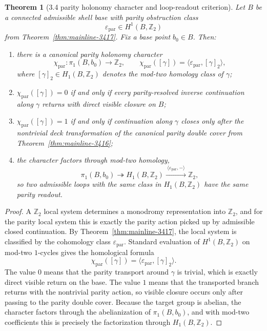 \documentclass[12pt,a4paper]{article}
\newtheorem{theorem}{Theorem}[section]
\begin{document}
\begin{theorem}[3.4 parity holonomy character and loop-readout criterion]
\label{thm:mainline-3418}
Let $B$ be a connected admissible shell base with parity obstruction class
\[
 \varepsilon_{\mathrm{par}}\in H^1(B,\mathbb Z_2)
\]
from Theorem~\ref{thm:mainline-3417}. Fix a base point $b_0\in B$. Then:
\begin{enumerate}[label=(\roman*)]
 \item there is a canonical parity holonomy character
 \[
 \chi_{\mathrm{par}}:\pi_1(B,b_0)\to \mathbb Z_2,
 \qquad
 \chi_{\mathrm{par}}([\gamma])=\langle \varepsilon_{\mathrm{par}},[\gamma]_{2}\rangle,
 \]
 where $[\gamma]_2\in H_1(B,\mathbb Z_2)$ denotes the mod-two homology class of $\gamma$;
 \item $\chi_{\mathrm{par}}([\gamma])=0$ if and only if every parity-resolved inverse continuation along $\gamma$ returns with direct visible closure on $B$;
 \item $\chi_{\mathrm{par}}([\gamma])=1$ if and only if continuation along $\gamma$ closes only after the nontrivial deck transformation of the canonical parity double cover from Theorem~\ref{thm:mainline-3416};
 \item the character factors through mod-two homology,
 \[
 \pi_1(B,b_0)\twoheadrightarrow H_1(B,\mathbb Z_2)\xrightarrow{\ \langle \varepsilon_{\mathrm{par}},-\rangle\ }\mathbb Z_2,
 \]
 so two admissible loops with the same class in $H_1(B,\mathbb Z_2)$ have the same parity readout.
\end{enumerate}
\end{theorem}

\begin{proof}
A $\mathbb Z_2$ local system determines a monodromy representation into $\mathbb Z_2$, and for the parity local system this is exactly the parity action picked up by admissible closed continuation. By Theorem~\ref{thm:mainline-3417}, the local system is classified by the cohomology class $\varepsilon_{\mathrm{par}}$. Standard evaluation of $H^1(B,\mathbb Z_2)$ on mod-two $1$-cycles gives the homological formula
\[
 \chi_{\mathrm{par}}([\gamma])=\langle \varepsilon_{\mathrm{par}},[\gamma]_2\rangle.
\]
The value $0$ means that the parity transport around $\gamma$ is trivial, which is exactly direct visible return on the base. The value $1$ means that the transported branch returns with the nontrivial parity action, so visible closure occurs only after passing to the parity double cover. Because the target group is abelian, the character factors through the abelianization of $\pi_1(B,b_0)$, and with mod-two coefficients this is precisely the factorization through $H_1(B,\mathbb Z_2)$.
\end{proof}
\end{document}
